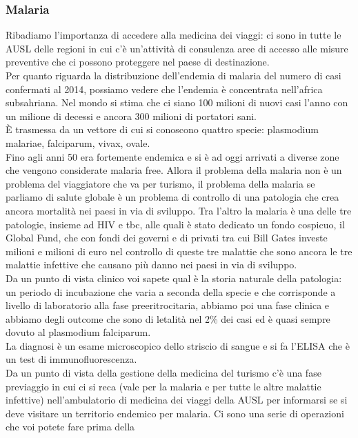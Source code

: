\subsubsection{Malaria}
Ribadiamo l'importanza di accedere alla medicina dei viaggi: ci sono
in tutte le AUSL delle regioni in cui c'è un'attività di consulenza aree
di accesso alle misure preventive che ci possono proteggere nel paese di
destinazione.\\
Per quanto riguarda la distribuzione dell'endemia di malaria del numero
di casi confermati al 2014, possiamo vedere che l'endemia è concentrata
nell'africa subsahriana. Nel mondo si stima che ci siano 100 milioni di
nuovi casi l'anno con un milione di decessi e ancora 300 milioni di
portatori sani.\\
È trasmessa da un vettore di cui si conoscono quattro specie: plasmodium
malariae, falciparum, vivax, ovale.\\
Fino agli anni 50 era fortemente endemica e si è ad oggi arrivati a
diverse zone che vengono considerate malaria free. Allora il problema
della malaria non è un problema del viaggiatore che va per turismo, il
problema della malaria se parliamo di salute globale è un problema di
controllo di una patologia che crea ancora mortalità nei paesi in via di
sviluppo. Tra l'altro la malaria è una delle tre patologie, insieme ad
HIV e tbc, alle quali è stato dedicato un fondo cospicuo, il Global
Fund, che con fondi dei governi e di privati tra cui Bill Gates investe
milioni e milioni di euro nel controllo di queste tre malattie che sono
ancora le tre malattie infettive che causano più danno nei paesi in via
di sviluppo.\\
Da un punto di vista clinico voi sapete qual è la storia naturale della
patologia: un periodo di incubazione che varia a seconda della specie e
che corrisponde a livello di laboratorio alla fase preeritrocitaria,
abbiamo poi una fase clinica e abbiamo degli outcome che sono di
letalità nel 2\% dei casi ed è quasi sempre dovuto al plasmodium
falciparum.\\
La diagnosi è un esame microscopico dello striscio di sangue e si fa
l'ELISA che è un test di immunofluorescenza.\\
Da un punto di vista della gestione della medicina del turismo c'è una
fase previaggio in cui ci si reca (vale per la malaria e per tutte le
altre malattie infettive) nell'ambulatorio di medicina dei viaggi della
AUSL per informarsi se si deve visitare un territorio endemico per
malaria. Ci sono una serie di operazioni che voi potete fare prima della
